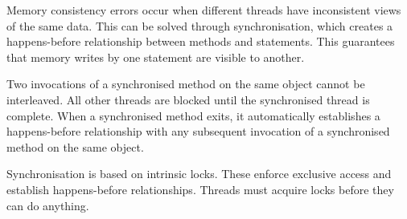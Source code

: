 Memory consistency errors occur when different threads have inconsistent views of the same data.
This can be solved through synchronisation, which creates a happens-before relationship between methods and statements.
This guarantees that memory writes by one statement are visible to another.

Two invocations of a synchronised method on the same object cannot be interleaved.
All other threads are blocked until the synchronised thread is complete.
When a synchronised method exits, it automatically establishes a happens-before relationship with any subsequent invocation of a synchronised method on the same object.

Synchronisation is based on intrinsic locks.
These enforce exclusive access and establish happens-before relationships.
Threads must acquire locks before they can do anything.
